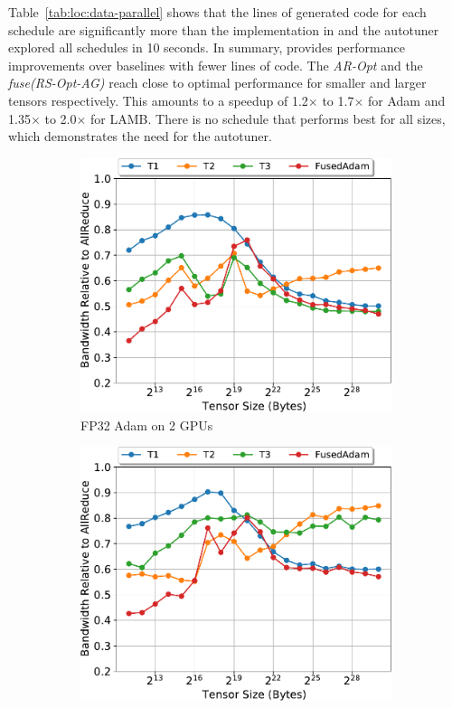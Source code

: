 Table~\ref{tab:loc:data-parallel} shows that the lines of generated code for each schedule are significantly more than the implementation in \tool and the autotuner explored all schedules in 10 seconds.
In summary, \tool provides performance improvements over baselines with fewer lines of code.
The \textit{AR-Opt} and the \textit{fuse(RS-Opt-AG)} reach close to optimal performance for smaller and larger tensors respectively. This amounts to a speedup of 1.2$\times$ to 1.7$\times$ for Adam and 1.35$\times$ to 2.0$\times$ for LAMB.  
There is no schedule that performs best for all sizes, which demonstrates the need for the autotuner. 

\iffalse
\begin{figure}
  \small
  \begin{subfigure}{0.66\columnwidth}
    \includegraphics[width=\columnwidth]{figures/results-adam-2-gpus.pdf}  
    \caption{FP32 Adam on 2 GPUs}
  \end{subfigure}
  \begin{subfigure}{0.66\columnwidth}
    \includegraphics[width=\columnwidth]{figures/results-adam-4-gpus.pdf}  

\end{subfigure}
\end{figure}
